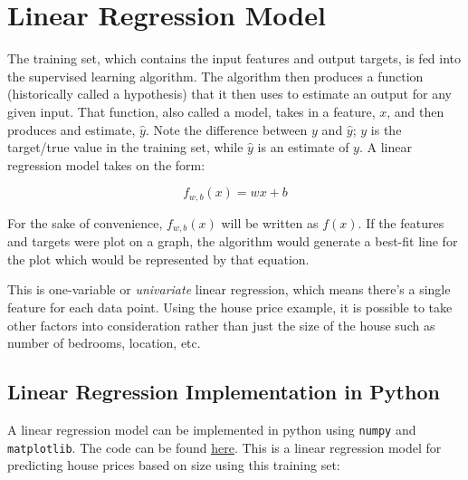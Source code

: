 \documentclass{article}
\begin{document}
\newpage

\section{Linear Regression Model}
The training set, which contains the input features and output targets, is fed into the supervised learning algorithm. The algorithm then produces a function (historically called a hypothesis) that it then uses to estimate an output for any given input. That function, also called a model, takes  in a feature, $x$, and then produces and estimate, $\hat{y}$. Note the difference between $y$ and $\hat{y}$; $y$ is the target/true value in the training set, while $\hat{y}$ is an estimate of $y$. A linear regression model takes on the form:

\[ f_{w,b}(x) = wx + b\]

\noindent For the sake of convenience, $f_{w,b}(x)$ will be written as $f(x)$. If the features and targets were plot on a graph, the algorithm would generate a best-fit line for the plot which would be represented by that equation.
\vspace{5mm}

\begin{center}
\end{center}

\noindent This is one-variable or \textit{univariate} linear regression, which means there's a single feature for each data point. Using the house price example, it is possible to take other factors into consideration rather than just the size of the house such as number of bedrooms, location, etc.

\subsection{Linear Regression Implementation in Python}
A linear regression model can be implemented in python using \texttt{numpy} and \texttt{matplotlib}. The code can be found \href{https://github.com/zvenc/ml-notes/blob/main/intro/code/house_price.py}{\underline{here}}. This is a linear regression model for predicting house prices based on size using this training set:
\end{document}
